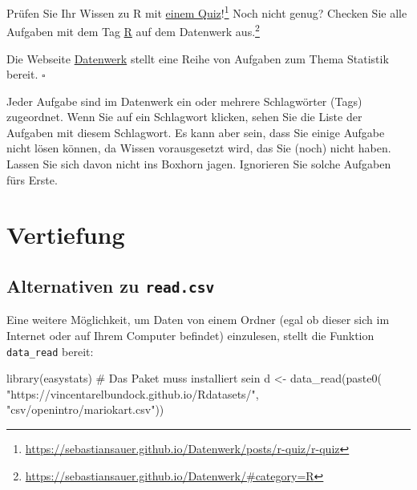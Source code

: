 \documentclass[
  letterpaper,
  twoside,
  open=any]{scrbook}
\newenvironment{Shaded}{\begin{snugshade}}{\end{snugshade}}
\newcommand{\CommentTok}[1]{\textcolor[rgb]{0.37,0.37,0.37}{#1}}
\newcommand{\FunctionTok}[1]{\textcolor[rgb]{0.28,0.35,0.67}{#1}}
\newcommand{\NormalTok}[1]{\textcolor[rgb]{0.00,0.23,0.31}{#1}}
\newcommand{\OtherTok}[1]{\textcolor[rgb]{0.00,0.23,0.31}{#1}}
\newcommand{\StringTok}[1]{\textcolor[rgb]{0.13,0.47,0.30}{#1}}
\theoremstyle{definition}
\theoremstyle{definition}
\theoremstyle{definition}
\theoremstyle{remark}
\begin{document}
Prüfen Sie Ihr Wissen zu R mit
\href{https://sebastiansauer.github.io/Datenwerk/posts/r-quiz/r-quiz}{einem
Quiz}!\footnote{\url{https://sebastiansauer.github.io/Datenwerk/posts/r-quiz/r-quiz}}
Noch nicht genug? Checken Sie alle Aufgaben mit dem Tag
\href{https://sebastiansauer.github.io/Datenwerk/\#category=R}{R} auf
dem Datenwerk aus.\footnote{\url{https://sebastiansauer.github.io/Datenwerk/\#category=R}}

\begin{tcolorbox}[enhanced jigsaw, colbacktitle=quarto-callout-note-color!10!white, colframe=quarto-callout-note-color-frame, coltitle=black, arc=.35mm, breakable, opacitybacktitle=0.6, toprule=.15mm, colback=white, rightrule=.15mm, opacityback=0, toptitle=1mm, title=\textcolor{quarto-callout-note-color}{\faInfo}\hspace{0.5em}{Hinweis}, titlerule=0mm, bottomtitle=1mm, bottomrule=.15mm, leftrule=.75mm, left=2mm]

Die Webseite
\href{https://sebastiansauer.github.io/Datenwerk/}{Datenwerk} stellt
eine Reihe von Aufgaben zum Thema Statistik bereit. \(\square\)

\end{tcolorbox}

Jeder Aufgabe sind im Datenwerk ein oder mehrere Schlagwörter (Tags)
zugeordnet. Wenn Sie auf ein Schlagwort klicken, sehen Sie die Liste der
Aufgaben mit diesem Schlagwort. Es kann aber sein, dass Sie einige
Aufgabe nicht lösen können, da Wissen vorausgesetzt wird, das Sie (noch)
nicht haben. Lassen Sie sich davon nicht ins Boxhorn jagen. Ignorieren
Sie solche Aufgaben fürs Erste.

\section{Vertiefung}\label{vertiefung-1}

\subsection{\texorpdfstring{Alternativen zu
\texttt{read.csv}}{Alternativen zu read.csv}}\label{alternativen-zu-read.csv}

Eine weitere Möglichkeit, um Daten von einem Ordner (egal ob dieser sich
im Internet oder auf Ihrem Computer befindet) einzulesen, stellt die
Funktion \texttt{data\_read} bereit:

\begin{Shaded}
\begin{Highlighting}[]
\FunctionTok{library}\NormalTok{(easystats)  }\CommentTok{\# Das Paket muss installiert sein}
\NormalTok{d }\OtherTok{\textless{}{-}} \FunctionTok{data\_read}\NormalTok{(}\FunctionTok{paste0}\NormalTok{(}
  \StringTok{"https://vincentarelbundock.github.io/Rdatasets/"}\NormalTok{,}
  \StringTok{"csv/openintro/mariokart.csv"}\NormalTok{))}
\end{Highlighting}
\end{Shaded}
\end{document}
